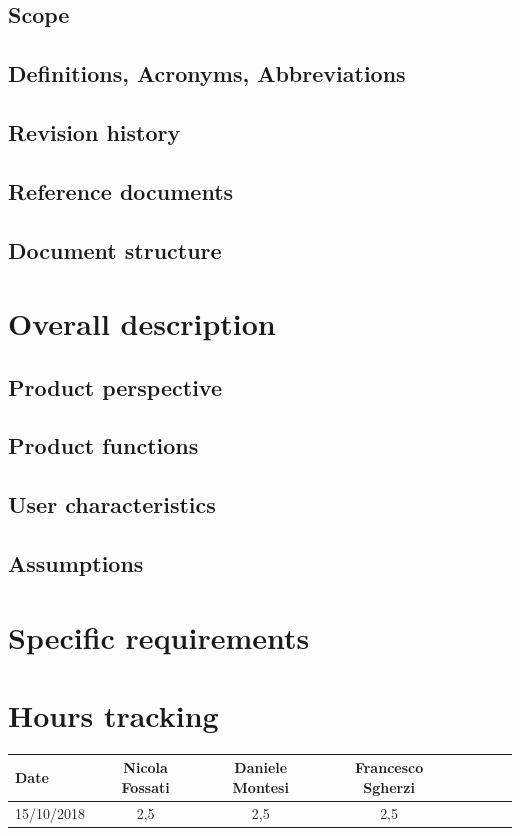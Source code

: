 \documentclass[a4paper,oneside,11pt]{article}
\begin{document}
        \subsection{Scope}
        
        \subsection{Definitions, Acronyms, Abbreviations}
        \subsection{Revision history}
        \subsection{Reference documents}
        \subsection{Document structure}
        
        
    \section{Overall description}
        \subsection{Product perspective}
        \subsection{Product functions}
        \subsection{User characteristics}
        \subsection{Assumptions}
        
        
    \section{Specific requirements}
    
    
    
    \section{Hours tracking}
        \begin{tabular}{l*{6}{c}r}
            Date & Nicola Fossati & Daniele Montesi & Francesco Sgherzi \\
            \hline
            15/10/2018 & 2,5 & 2,5 & 2,5   \\
        \end{tabular}
\end{document}
